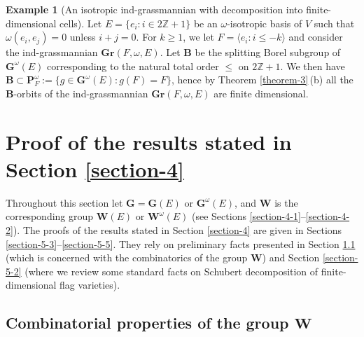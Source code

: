 \documentclass[12pt]{amsart}
\theoremstyle{definition}
\newtheorem{example}{Example}
\begin{document}
\begin{example}[An isotropic ind-grassmannian with decomposition into finite-dimensional cells]
Let $E=\{e_i:i\in 2\mathbb{Z}+1\}$ be an $\omega$-isotropic basis of $V$ such that $\omega(e_i,e_j)=0$ unless $i+j=0$. For $k\geq 1$, we let $F=\langle e_i:i\leq -k\rangle$ and consider the ind-grassmannian $\mathbf{Gr}(F,\omega,E)$. Let $\mathbf{B}$ be the splitting Borel subgroup of $\mathbf{G}^\omega(E)$ corresponding to the natural total order $\leq$ on $2\mathbb{Z}+1$. We then have $\mathbf{B}\subset\mathbf{P}_F^\omega:=\{g\in\mathbf{G}^\omega(E):g(F)=F\}$, hence
by Theorem \ref{theorem-3}\,{\rm (b)} all the $\mathbf{B}$-orbits of the ind-grassmannian $\mathbf{Gr}(F,\omega,E)$ are finite dimensional.
\end{example}

\section{Proof of the results stated in Section \ref{section-4}}

\label{section-5}

Throughout this section let $\mathbf{G}=\mathbf{G}(E)$ or $\mathbf{G}^\omega(E)$, and $\mathbf{W}$ is the corresponding group $\mathbf{W}(E)$ or $\mathbf{W}^\omega(E)$ (see Sections \ref{section-4-1}--\ref{section-4-2}).
The proofs of the results stated in Section \ref{section-4} are given in Sections \ref{section-5-3}--\ref{section-5-5}. They rely on preliminary facts presented in Section \ref{section-5-1} (which is concerned with the combinatorics of the  group $\mathbf{W}$) and Section \ref{section-5-2} (where we review some standard facts on Schubert decomposition of finite-dimensional flag varieties).


\subsection{Combinatorial properties of the group $\mathbf{W}$}

\label{section-5-1}
\end{document}
